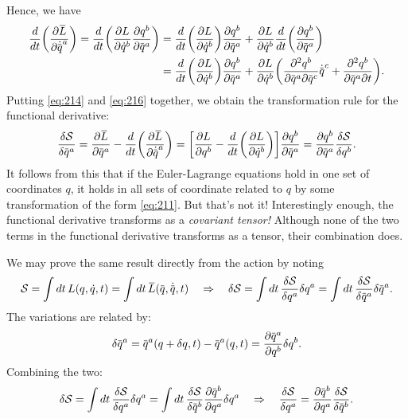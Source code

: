 \documentclass{article}
\begin{document}
Hence, we have	
\begin{align} \label{eq:216}
    \begin{split}
        \dv{t}\qty(\pdv{\overbar{L}}{\dot{\overbar{q}}^a}) = \dv{t} \qty(\pdv{L}{\dot{q}^b} \pdv{q^b}{\overbar{q}^a}) &= \dv{t}\qty(\pdv{L}{\dot{q}^b}) \pdv{q^b}{\overbar{q}^a} + \pdv{L}{\dot{q}^b} \dv{t}\qty(\pdv{q^b}{\overbar{q}^a}) \\
        &= \dv{t}\qty(\pdv{L}{\dot{q}^b}) \pdv{q^b}{\overbar{q}^a} + \pdv{L}{\dot{q}^b}\qty(\pdv{q^b}{\overbar{q}^a}{\overbar{q}^c} \dot{\overbar{q}}^c + \pdv{q^b}{\overbar{q}^a}{t}).
    \end{split}
\end{align}
Putting \eqref{eq:214} and \eqref{eq:216} together, we obtain the transformation rule for the functional derivative:
\begin{equation}
    \fdv{\mathcal{S}}{\overbar{q}^a} = \pdv{\overbar{L}}{\overbar{q}^a} - \dv{t}\qty(\pdv{\overbar{L}}{\dot{\overbar{q}}^a}) = \qty[\pdv{L}{q^b} - \dv{t}\qty(\pdv{L}{\dot{q}^b})] \pdv{q^b}{\overbar{q}^a} = \pdv{q^b}{\overbar{q}^a} \fdv{\mathcal{S}}{q^b}.
\end{equation}
It follows from this that if the Euler-Lagrange equations hold in one set of coordinates $q$, it holds in all sets of coordinate related to $q$ by some transformation of the form \eqref{eq:211}. But that's not it! Interestingly enough, the functional derivative transforms as a \textit{covariant tensor!} Although none of the two terms in the functional derivative transforms as a tensor, their combination does. 
\begin{note}
	We may prove the same result directly from the action by noting
	\begin{equation}
		\mathcal{S} = \int \dd{t} L(q,\dot{q},t) = \int \dd{t} \overbar{L}(\overbar{q}, \dot{\overbar{q}}, t) \implies \delta \mathcal{S} = \int \dd{t} \fdv{\mathcal{S}}{q^{a}} \delta q^{a} = \int \dd{t} \fdv{\mathcal{S}}{\overbar{q}^{a}} \delta \overbar{q}^{a}.
	\end{equation}
	The variations are related by:
	\begin{equation}
		\delta \overbar{q}^{a} = \overbar{q}^{a}(q+\delta q, t) - \overbar{q}^{a}(q,t) = \pdv{\overbar{q}^{a}}{q^{b}} \delta q^{b}.
	\end{equation}
	Combining the two:
	\begin{equation}
		\delta \mathcal{S} = \int \dd{t} \fdv{\mathcal{S}}{q^{a}} \delta q^{a} = \int \dd{t} \fdv{\mathcal{S}}{\overbar{q}^{b}} \pdv{\overbar{q}^{b}}{q^{a}} \delta q^{a} \implies \fdv{\mathcal{S}}{q^{a}} = \pdv{\overbar{q}^{b}}{q^{a}} \fdv{\mathcal{S}}{\overbar{q}^{b}}.
	\end{equation}
\end{note}
\end{document}
